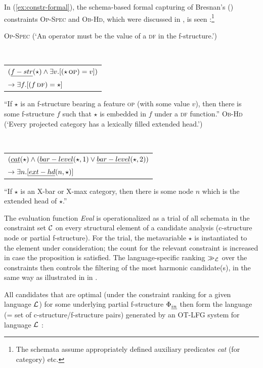 \documentclass[output=paper,hidelinks]{langscibook}
\begin{document}
In (\ref{ex:constr-formal}), the schema-based formal capturing of Bresnan's (\citeyear{bresnan00opt}) constraints \textsc{Op-Spec} and \textsc{Ob-Hd}, which were discussed in , is seen \citep[for details, see][90ff]{Kuhn-CSLI-book}:\footnote{The schemata assume appropriately defined auxiliary predicates \emph{cat} (for category) etc.}

\ea\label{ex:constr-formal}
\ea
\textsc{Op-Spec} (`An operator must be the value of a \textsc{df} in the f-structure.')

\ \ \begin{tabular}[t]{l}
$(\emph{f-str}(\star) \wedge \exists v.[(\star \, \textsc{op})=v])$\\ $\rightarrow \exists f.[(f \, \textsc{df})=\star]$
\end{tabular}

``If $\star$ is an f-structure bearing a feature \textsc{op} (with some value $v$), then there is some f-structure $f$ such that $\star$ is embedded in $f$ under a \textsc{df} function.'' 
\ex \textsc{Ob-Hd} (`Every projected category has a lexically filled extended head.')


\ \ \begin{tabular}[t]{l}
$(\emph{cat}(\star) \wedge (\emph{bar-level}(\star,1) \vee \emph{bar-level}(\star,2))$ \\ $\rightarrow \exists n.[\emph{ext-hd}(n,\star)]$
\end{tabular}

``If $\star$ is an X-bar or X-max category, then there is some node $n$ which is the extended head of $\star$.''
\z
\z

\noindent
The evaluation function \emph{Eval} is operationalized as a trial of all schemata in the constraint set $\cal{C}$ on every structural element of a candidate analysis (c-structure node or partial f-structure).
For the trial, the metavariable $\star$ is instantiated to the element under consideration; the count for the relevant constraint is increased in case the proposition is satisfied. The language-specific ranking $\gg_{\cal{L}}$ over the constraints then controls the filtering of the most harmonic candidate(s), in the same way as illustrated in   in .


All candidates that are optimal (under the constraint ranking for a given language ${\cal L}$) for some underlying partial f-structure $\Phi_{\emph{in}}$ then form the language (= set of c-structure/f-structure pairs) generated by an OT-LFG system for language ${\cal L}$ \citep[][117]{Kuhn-CSLI-book}:
\end{document}
